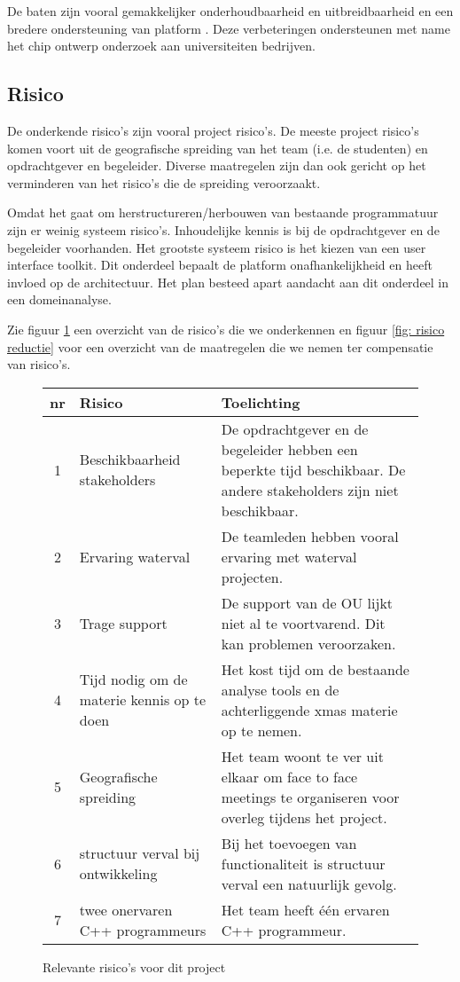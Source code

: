 De baten zijn vooral gemakkelijker onderhoudbaarheid en uitbreidbaarheid en een bredere ondersteuning van platform .
Deze verbeteringen ondersteunen met name het chip ontwerp onderzoek aan universiteiten bedrijven.

\subsection{Risico}

De onderkende risico's zijn vooral project risico's. De meeste project risico's komen voort uit de
geografische spreiding van het team (i.e. de studenten) en opdrachtgever
en begeleider. Diverse maatregelen zijn dan ook gericht op het verminderen
van het risico's die de spreiding veroorzaakt.


Omdat het gaat om herstructureren/herbouwen van bestaande programmatuur zijn er weinig systeem risico's.
Inhoudelijke kennis is bij de opdrachtgever en de begeleider voorhanden. Het grootste systeem risico is het kiezen
van een user interface toolkit. Dit onderdeel bepaalt de platform onafhankelijkheid en heeft invloed op de architectuur.
Het plan besteed apart aandacht aan dit onderdeel in een domeinanalyse.

Zie figuur \ref{fig: risico} een overzicht van de risico's die we onderkennen en figuur \ref{fig: risico reductie} voor
een overzicht van de maatregelen die we nemen ter compensatie van risico's.

\begin{figure}[ht]
\begin{center}
\tiny
\begin{tabular}{|c|p{20em}|p{30em}|}
\hline
{\bf nr} & {\bf Risico} & {\bf Toelichting} \\\hline
 1 & Beschikbaarheid stakeholders  & De opdrachtgever en de begeleider hebben een beperkte tijd
					beschikbaar. De andere stakeholders zijn niet beschikbaar.\\\hline
 2 & Ervaring waterval & De teamleden hebben vooral ervaring met waterval projecten.\\\hline
 3 & Trage support & De support van de OU lijkt niet al te voortvarend. Dit kan problemen veroorzaken.\\\hline
 4 & Tijd nodig om de materie kennis op te doen & Het kost tijd om de bestaande analyse
					tools en de achterliggende
					xmas materie op te nemen.\\\hline
 5 & Geografische spreiding & Het team woont te ver uit elkaar om face to face meetings te
				organiseren voor overleg tijdens het project.\\\hline
 6 & structuur verval bij ontwikkeling & Bij het toevoegen van functionaliteit is structuur verval een
				natuurlijk gevolg.\\\hline
 7 & twee onervaren C++ programmeurs & Het team heeft \'e\'en ervaren C++ programmeur.\\\hline

\end{tabular}
\end{center}
 \caption{Relevante risico's voor dit project}
 \label{fig: risico}
\end{figure}


